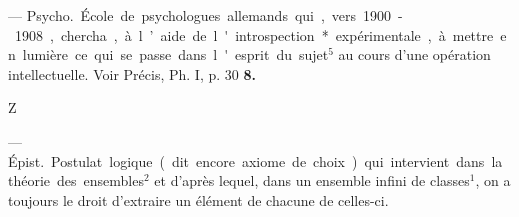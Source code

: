 \begin{itemize}[leftmargin=1cm, label=, itemsep=1pt]
 — \si{Psycho.}
École de psychologues allemands
qui, vers 1900-1908, chercha, à
l’aide de l'introspection* expérimentale, à mettre en lumière ce qui
se passe dans l'esprit du sujet$^5$ au
cours d’une opération intellectuelle.
Voir Précis, Ph. I, p. 30 {\bf 8.}

\begin{center}
Z
\end{center}

 — \si{Épist.} Postulat logique (dit encore axiome de
choix) qui intervient dans la théorie
des ensembles$^2$ et d’après lequel,
dans un ensemble infini de classes$^1$,
on a toujours le droit d'extraire
un élément de chacune de celles-ci.

	\end{itemize}
